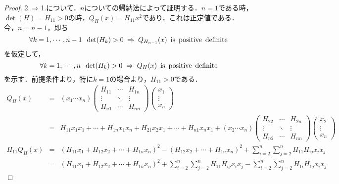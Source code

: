 \documentclass[uplatex, dvipdfmx]{jsreport}
\begin{document}
\begin{proof}
    2.$\Rightarrow$1.について．$n$についての帰納法によって証明する．$n=1$である時，$\det(H)=H_{11}>0$の時，$Q_H(x)=H_{11}x^2$であり，これは正定値である．
    今，$n=n-1$，即ち
    \begin{equation}\label{proof-assumption}
        \forall k=1,\cdots,n-1\;\;\det(H_k)>0 \;\Rightarrow\; Q_{H_{n-1}}(x)\hspace{0.5em}\mathrm{is\hspace{0.5em}positive\hspace{0.5em}definite}
    \end{equation}
    を仮定して，
    \begin{equation}\label{proof-statement}
        \forall k=1,\cdots,n\;\;\det(H_k)>0 \;\Rightarrow\; Q_{H}(x)\hspace{0.5em}\mathrm{is\hspace{0.5em} positive\hspace{0.5em} definite}
    \end{equation}
    を示す．前提条件より，特に$k=1$の場合より，$H_{11}>0$である．
    \begin{eqnarray*}
        Q_H(x)&=& (x_1\cdots x_n)\left(\begin{array}{lcr}H_{11} &\cdots &H_{1n} \\ \vdots & \ddots &\vdots \\ H_{n1}&\cdots&H_{nn}\end{array}\right)\left(\begin{array}{c}x_1 \\ \vdots \\ x_n\end{array}\right) \\
        &=& H_{11}x_1x_1+\cdots +H_{1n}x_1x_n+H_{21}x_2x_1+\cdots+H_{n1}x_nx_1+(x_2\cdots x_n)\left(\begin{array}{lcr}H_{22} &\cdots &H_{2n} \\ \vdots & \ddots &\vdots \\ H_{n2}&\cdots&H_{nn}\end{array}\right)\left(\begin{array}{c}x_2 \\ \vdots \\ x_n\end{array}\right) \\
        H_{11}Q_H(x) &=& (H_{11}x_1+H_{12}x_2+\cdots+H_{1n}x_n)^2 - (H_{12}x_2+\cdots+H_{1n}x_n)^2+\sum^n_{i=2}\sum^n_{j=2}H_{11}H_{ij}x_ix_j \\
        &=& (H_{11}x_1+H_{12}x_2+\cdots+H_{1n}x_n)^2 +\sum^n_{i=2}\sum^n_{j=2}H_{11}H_{ij}x_ix_j -\sum^n_{i=2}\sum^n_{j=2}H_{1i}H_{1j}x_ix_j 

\end{eqnarray*}
\end{proof}
\end{document}
